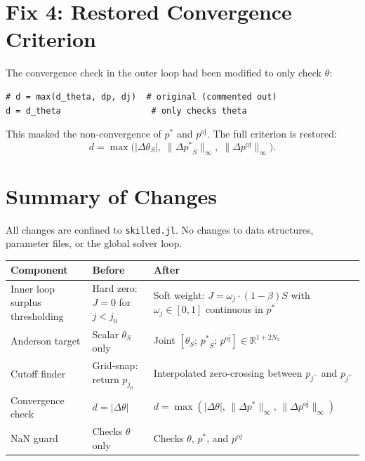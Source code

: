 \documentclass[11pt,a4paper]{article}
\newcommand{\pstar}{\mathord{p^{*}}}
\newcommand{\poj}{\mathord{p^{\mathrm{oj}}}}
\newcommand{\supnorm}[1]{\lVert #1 \rVert_\infty}
\newcommand{\code}[1]{\texttt{#1}}
\theoremstyle{definition}
\begin{document}
\section{Fix 4: Restored Convergence Criterion}
\label{sec:conv-criterion}

The convergence check in the outer loop had been modified to only check
$\theta$:
\begin{lstlisting}
# d = max(d_theta, dp, dj)  # original (commented out)
d = d_theta                  # only checks theta
\end{lstlisting}
This masked the non-convergence of $\pstar$ and $\poj$.  The full criterion
is restored:
\begin{equation}
    d = \max\bigl(\lvert\Delta\theta_S\rvert,\;
                  \supnorm{\Delta \pstar_S},\;
                  \supnorm{\Delta \poj}\bigr).
\end{equation}


\section{Summary of Changes}

All changes are confined to \code{skilled.jl}.  No changes to data
structures, parameter files, or the global solver loop.

\begin{center}
\renewcommand{\arraystretch}{1.3}
\begin{tabular}{@{}p{3.5cm}p{4.5cm}p{5cm}@{}}
\toprule
\textbf{Component} & \textbf{Before} & \textbf{After} \\
\midrule
Inner loop surplus thresholding &
Hard zero: $J = 0$ for $j < j_0$ &
Soft weight: $J = \omega_j \cdot (1{-}\beta) S$ with
$\omega_j \in [0,1]$ continuous in $\pstar$ \\

Anderson target &
Scalar $\theta_S$ only &
Joint $[\theta_S;\, \pstar_S;\, \poj] \in \mathbb{R}^{1+2N_x}$ \\

Cutoff finder &
Grid-snap: return $p_{j_0}$ &
Interpolated zero-crossing between $p_{j^{-}}$ and $p_{j^{+}}$ \\

Convergence check &
$d = \lvert\Delta\theta\rvert$ &
$d = \max(\lvert\Delta\theta\rvert,\,
         \supnorm{\Delta \pstar},\, \supnorm{\Delta \poj})$ \\

NaN guard &
Checks $\theta$ only &
Checks $\theta$, $\pstar$, and $\poj$ \\
\bottomrule
\end{tabular}
\end{center}
\end{document}
